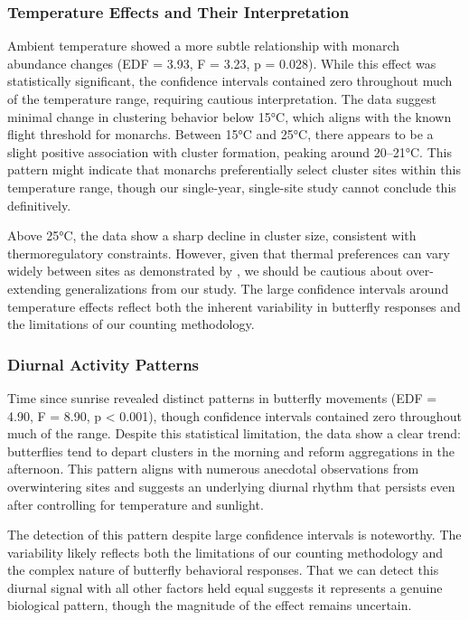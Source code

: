 \subsubsection{Temperature Effects and Their Interpretation}

Ambient temperature showed a more subtle relationship with monarch abundance changes (EDF = 3.93, F = 3.23, p = 0.028). While this effect was statistically significant, the confidence intervals contained zero throughout much of the temperature range, requiring cautious interpretation. The data suggest minimal change in clustering behavior below 15°C, which aligns with the known flight threshold for monarchs. Between 15°C and 25°C, there appears to be a slight positive association with cluster formation, peaking around 20--21°C. This pattern might indicate that monarchs preferentially select cluster sites within this temperature range, though our single-year, single-site study cannot conclude this definitively.

Above 25°C, the data show a sharp decline in cluster size, consistent with thermoregulatory constraints. However, given that thermal preferences can vary widely between sites as demonstrated by \citeauthor{SanieeThesis2016} \autocite{SanieeThesis2016}, we should be cautious about over-extending generalizations from our study. The large confidence intervals around temperature effects reflect both the inherent variability in butterfly responses and the limitations of our counting methodology.

\subsubsection{Diurnal Activity Patterns}

Time since sunrise revealed distinct patterns in butterfly movements (EDF = 4.90, F = 8.90, p < 0.001), though confidence intervals contained zero throughout much of the range. Despite this statistical limitation, the data show a clear trend: butterflies tend to depart clusters in the morning and reform aggregations in the afternoon. This pattern aligns with numerous anecdotal observations from overwintering sites and suggests an underlying diurnal rhythm that persists even after controlling for temperature and sunlight.

The detection of this pattern despite large confidence intervals is noteworthy. The variability likely reflects both the limitations of our counting methodology and the complex nature of butterfly behavioral responses. That we can detect this diurnal signal with all other factors held equal suggests it represents a genuine biological pattern, though the magnitude of the effect remains uncertain.
